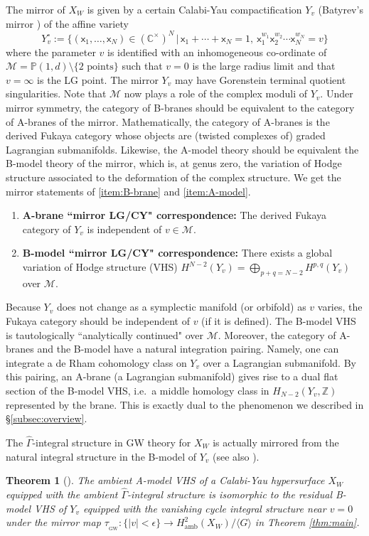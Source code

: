 \documentclass[11pt]{amsart}
\newtheorem{thm}{Theorem}[section] %
\theoremstyle{definition} %
\theoremstyle{remark} %
\newcommand{\CC}{\mathbb C}
\newcommand{\PP}{\mathbb P}
\newcommand{\ZZ}{\mathbb Z}
\newcommand{\cM}{\mathcal{M}}
\newcommand{\Yo}{Y^\circ}
\newcommand{\amb}{\operatorname{amb}}
\newcommand{\sGW}{\operatorname{_{GW}}}
\newcommand{\hGamma}{\widehat{\Gamma}}
\newcommand{\sfx}{\mathsf{x}}
\begin{document}
The mirror of $X_W$ is given by a certain Calabi-Yau 
compactification $Y_v$ (Batyrev's mirror \cite{Batyrev}) 
of the affine variety 
\[
\Yo_v := \{(\sfx_1,\dots,\sfx_N) \in (\CC^\times)^N 
\,|\, \sfx_1 + \cdots + \sfx_N=1, \ 
\sfx_1^{w_1} \sfx_2^{w_2} \cdots \sfx_N^{w_N} =v\} 
\]
where the parameter $v$ is identified 
with an inhomogeneous co-ordinate 
of $\cM = \PP(1,d) \setminus \{\text{2 points}\}$ 
such that $v=0$ is the large radius limit 
and that $v=\infty$ is the LG point. 
The mirror $Y_v$ may have Gorenstein terminal quotient 
singularities. 
Note that $\cM$ now plays a role of the complex moduli of $Y_v$. 
Under mirror symmetry, the category of B-branes should be 
equivalent to the category of A-branes of the mirror. 
Mathematically, the category of A-branes is the 
derived Fukaya category whose objects are (twisted complexes of) 
graded Lagrangian submanifolds.  
Likewise, the A-model theory should be equivalent 
the B-model theory of the mirror, which is, at genus zero,  
the variation of Hodge structure 
associated to the deformation of the complex structure.   
We get the mirror statements of \eqref{item:B-brane} 
and \eqref{item:A-model}. 
\begin{enumerate} 
\item[(\hypertarget{item:A-brane}{1'})] 
{\bf A-brane ``mirror LG/CY" correspondence:}
The derived Fukaya category of $Y_v$ is independent of $v\in \cM$. 

\item[\hypertarget{item:B-model}{(2')}] 
{\bf B-model ``mirror LG/CY" correspondence:} 
There exists a global variation of Hodge structure (VHS) 
$H^{N-2}(Y_v)=\bigoplus_{p+q=N-2} H^{p,q}(Y_v)$ over $\cM$. 
\end{enumerate} 
Because $Y_v$ does not change as a symplectic manifold 
(or orbifold) as $v$ varies, 
the Fukaya category should be independent of $v$ (if it is defined). 
The B-model VHS is tautologically ``analytically continued" over $\cM$. 
Moreover, the category of A-branes and the B-model 
have a natural integration pairing.  
Namely, one can integrate a de Rham cohomology class on $Y_v$ 
over a Lagrangian submanifold.  
By this pairing, an A-brane (a Lagrangian submanifold) 
gives rise to a dual flat section of the B-model VHS,  
i.e.\ a middle homology class in $H_{N-2}(Y_v,\ZZ)$ 
represented by the brane. 
This is exactly dual to the phenomenon we described in \S \ref{subsec:overview}. 

The $\hGamma$-integral structure in GW theory for $X_W$ 
is actually mirrored from the natural integral structure 
in the B-model of $Y_v$ 
(see also \cite[Conjecture 4.2.10]{CR:LGconference}). 
\begin{thm}[{\cite[Theorem 6.9]{Iritani:period}}]
The ambient A-model VHS of a Calabi-Yau hypersurface $X_W$ 
equipped with  the ambient $\hGamma$-integral structure 
is isomorphic to the residual B-model VHS of $Y_v$ 
equipped with the vanishing cycle integral structure 
near $v=0$ under the mirror map $\tau_{\sGW} \colon \{|v|<\epsilon\} 
\to H^2_{\amb}(X_W)/\langle G\rangle$ in Theorem \ref{thm:main}.  
\end{thm} 
\end{document}
